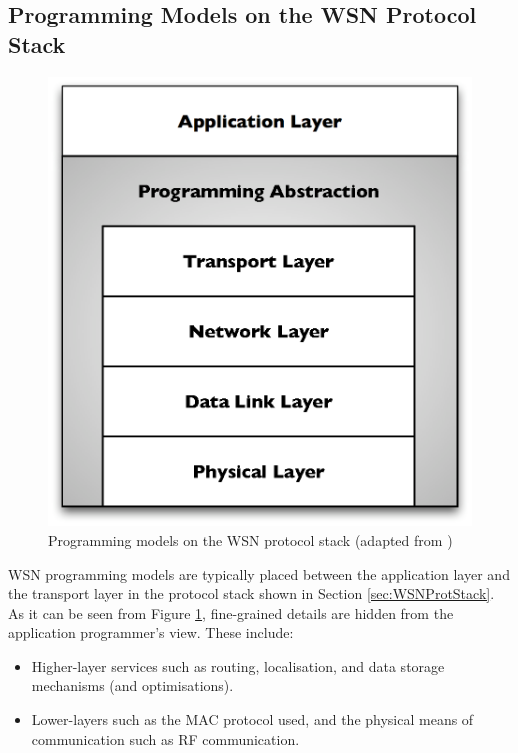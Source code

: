 \subsection{Programming Models on the WSN Protocol Stack}

\begin{figure}
\centering
\includegraphics[scale=0.61]{img/ProtStack_ProgAbstr.eps}
\caption[Programming models on the WSN protocol stack]{Programming models on the WSN protocol
stack (adapted from \cite{mottola_middleware:2008})}
\label{Fig:ProtStack_ProgAbstr}
\end{figure}

WSN programming models are typically placed between the application layer and
the
transport layer in the protocol stack shown in Section \ref{sec:WSNProtStack}. As it can be seen from
Figure \ref{Fig:ProtStack_ProgAbstr},
fine-grained details are hidden from the application programmer's view. These
include:

\begin{itemize}
  \item Higher-layer services such as routing, localisation, and data storage
  mechanisms (and optimisations).
  \item Lower-layers such as the MAC protocol used, and the physical means of
  communication such as RF communication.
\end{itemize}

